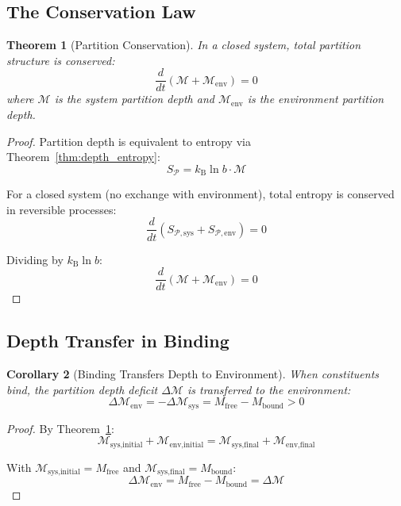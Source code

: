 \documentclass[twocolumn,10pt,a4paper]{article}
\newtheorem{theorem}{Theorem}[section]
\newtheorem{corollary}[theorem]{Corollary}
\theoremstyle{definition}
\theoremstyle{remark}
\newcommand{\kB}{k_{\mathrm{B}}}
\newcommand{\Partition}{\mathcal{P}}
\newcommand{\Depth}{\mathcal{M}}
\newcommand{\Mfree}{M_{\mathrm{free}}}
\newcommand{\Mbound}{M_{\mathrm{bound}}}
\begin{document}
\subsection{The Conservation Law}

\begin{theorem}[Partition Conservation]
\label{thm:conservation}
In a closed system, total partition structure is conserved:
\begin{equation}
    \frac{d}{dt}\left(\Depth + \Depth_{\text{env}}\right) = 0
\end{equation}
where $\Depth$ is the system partition depth and $\Depth_{\text{env}}$ is the environment partition depth.
\end{theorem}

\begin{proof}
Partition depth is equivalent to entropy via Theorem~\ref{thm:depth_entropy}:
\begin{equation}
    S_{\Partition} = \kB \ln b \cdot \Depth
\end{equation}

For a closed system (no exchange with environment), total entropy is conserved in reversible processes:
\begin{equation}
    \frac{d}{dt}(S_{\Partition,\text{sys}} + S_{\Partition,\text{env}}) = 0
\end{equation}

Dividing by $\kB \ln b$:
\begin{equation}
    \frac{d}{dt}(\Depth + \Depth_{\text{env}}) = 0
\end{equation}
\end{proof}

\subsection{Depth Transfer in Binding}

\begin{corollary}[Binding Transfers Depth to Environment]
\label{cor:binding_transfer}
When constituents bind, the partition depth deficit $\Delta\Depth$ is transferred to the environment:
\begin{equation}
    \Delta\Depth_{\text{env}} = -\Delta\Depth_{\text{sys}} = \Mfree - \Mbound > 0
\end{equation}
\end{corollary}

\begin{proof}
By Theorem~\ref{thm:conservation}:
\begin{equation}
    \Depth_{\text{sys,initial}} + \Depth_{\text{env,initial}} = \Depth_{\text{sys,final}} + \Depth_{\text{env,final}}
\end{equation}

With $\Depth_{\text{sys,initial}} = \Mfree$ and $\Depth_{\text{sys,final}} = \Mbound$:
\begin{equation}
    \Delta\Depth_{\text{env}} = \Mfree - \Mbound = \Delta\Depth
\end{equation}
\end{proof}
\end{document}
